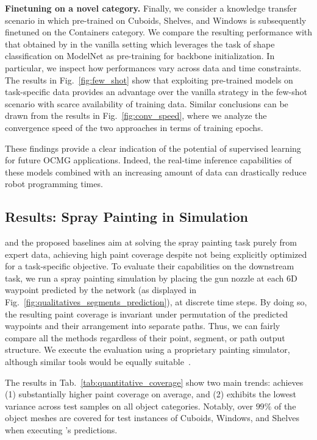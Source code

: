 \noindent \textbf{Finetuning on a novel category.}
Finally, we consider a knowledge transfer scenario in which \ours pre-trained on Cuboids, Shelves, and Windows is subsequently finetuned on the Containers category.
We compare the resulting performance with that obtained by \ours in the vanilla setting which leverages the task of shape classification on ModelNet as pre-training for backbone initialization. In particular, we inspect how performances vary across data and time constraints. The results in Fig.~\ref{fig:few_shot} show that exploiting pre-trained models on task-specific data provides an advantage over the vanilla strategy in the few-shot scenario with scarce availability of training data.
Similar conclusions can be drawn from the results in Fig.~\ref{fig:conv_speed}, where we analyze the convergence speed of the two approaches in terms of training epochs.

These findings provide a clear indication of the potential of supervised learning for future OCMG applications.
Indeed, the real-time inference capabilities of these models combined with an increasing amount of data can drastically reduce robot programming times.

\subsection{Results: Spray Painting in Simulation}
\label{sec:results_spray_painting}
\ours and the proposed baselines aim at solving the spray painting task purely from expert data, \ie achieving high paint coverage despite not being explicitly optimized for a task-specific objective.
%
To evaluate their capabilities on the downstream task, we run a spray painting simulation by placing the gun nozzle at each 6D waypoint predicted by the network (as displayed in Fig.~\ref{fig:qualitatives_segments_prediction}), at discrete time steps.
%
By doing so, the resulting paint coverage is invariant under permutation of the predicted waypoints and their arrangement into separate paths.
Thus, we can fairly compare all the methods regardless of their point, segment, or path output structure. 
We execute the evaluation using a proprietary painting simulator, although similar tools would be equally suitable~\cite{Andulkar_Incremental_2015}.

The results in Tab.~\ref{tab:quantitative_coverage} show two main trends: \ours achieves (1) substantially higher paint coverage on average, and (2) exhibits the lowest variance across test samples on all object categories.
Notably, over $99\%$ of the object meshes are covered for test instances of Cuboids, Windows, and Shelves when executing \ours's predictions.

